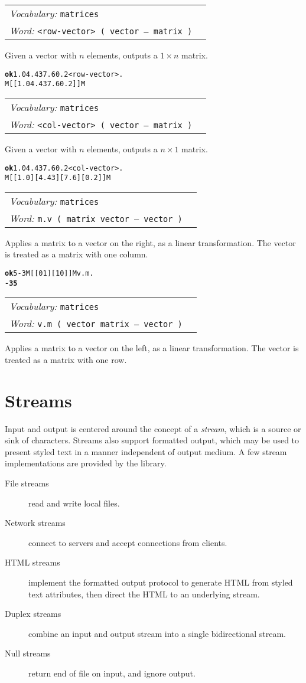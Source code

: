 \documentclass{book}
\newcommand{\tto}{\symbol{123}}
\newcommand{\ttc}{\symbol{125}}
\newcommand{\vocabulary}[1]{\emph{Vocabulary:} \texttt{#1}&\\}
\newcommand{\ordinaryword}[2]{\index{\texttt{#1}}\emph{Word:} \texttt{#2}&\\}
\newcommand{\wordtable}[1]{


\begin{tabularx}{12cm}{lX}
\hline
#1
\hline
\end{tabularx}

}
\begin{document}
\wordtable{
\vocabulary{matrices}
\ordinaryword{<row-vector>}{<row-vector>~( vector -- matrix )}
}
Given a vector with $n$ elements, outputs a $1 \times n$ matrix.
\begin{alltt}
\textbf{ok} \tto 1.0 4.43 7.6 0.2 \ttc <row-vector> .
M[ [ 1.0 4.43 7.6 0.2 ] ]M
\end{alltt}

\wordtable{
\vocabulary{matrices}
\ordinaryword{<col-vector>}{<col-vector>~( vector -- matrix )}
}
Given a vector with $n$ elements, outputs a $n \times 1$ matrix.
\begin{alltt}
\textbf{ok} \tto 1.0 4.43 7.6 0.2 \ttc <col-vector> .
M[ [ 1.0 ] [ 4.43 ] [ 7.6 ] [ 0.2 ] ]M
\end{alltt}

\wordtable{
\vocabulary{matrices}
\ordinaryword{m.v}{m.v~( matrix vector -- vector )}
}
Applies a matrix to a vector on the right, as a linear transformation. The vector is
treated as a matrix with one column.

\begin{alltt}
\textbf{ok} \tto 5 -3 \ttc M[ [ 0 1 ] [ 1 0 ] ]M v.m .
\textbf{\tto -3 5 \ttc}
\end{alltt}

\wordtable{
\vocabulary{matrices}
\ordinaryword{v.m}{v.m~( vector matrix -- vector )}
}
Applies a matrix to a vector on the left, as a linear transformation. The vector is
treated as a matrix with one row.

\section{Streams}

Input and output is centered around the concept of a \emph{stream}, which is a source or
sink of characters. Streams also support formatted output, which may be used to present styled text in a manner independent of output medium. A few stream implementations are provided by the library.

\begin{description}
\item[File streams] read and write local files.
\item[Network streams] connect to servers and accept connections from clients.
\item[HTML streams] implement the formatted output protocol to generate HTML from styled text attributes, then direct the HTML to an underlying stream.
\item[Duplex streams] combine an input and output stream into a single bidirectional stream.
\item[Null streams] return end of file on input, and ignore output.
\end{description}
\end{document}
